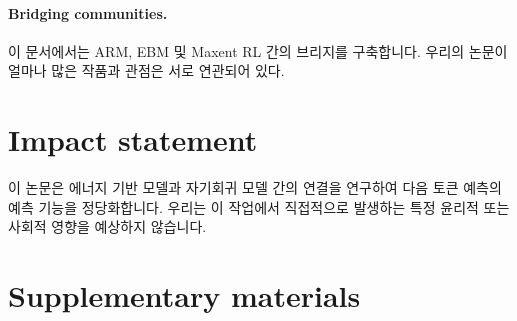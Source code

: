\documentclass{article}
\begin{document}
\paragraph{Bridging communities.}

이 문서에서는 ARM, EBM 및 Maxent RL 간의 브리지를 구축합니다.
우리의 논문이 얼마나 많은
작품과 관점은 서로 연관되어 있다.

\section*{Impact statement}

이 논문은 에너지 기반 모델과 자기회귀 모델 간의 연결을 연구하여 다음 토큰 예측의 예측 기능을 정당화합니다. 
우리는 이 작업에서 직접적으로 발생하는 특정 윤리적 또는 사회적 영향을 예상하지 않습니다.





\newpage
\appendix
\onecolumn

\section{Supplementary materials} 
 \label{sec:supp_material}
\end{document}

